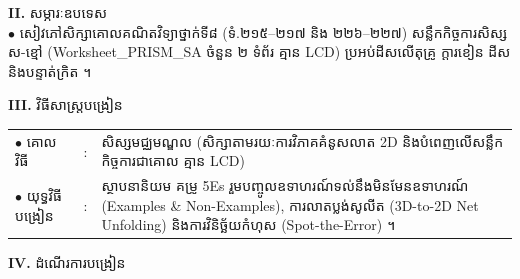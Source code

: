 \documentclass[a4paper,10pt]{article}
\newcommand{\en}[1]{{\TimesEn #1}}
\begin{document}
{\vspace{2pt}

\textbf{II.} {\muol សម្ភារៈឧបទេស}\\[1pt]
\hspace*{0.55cm}$\bullet$ \hspace{0.35cm} សៀវភៅសិក្សាគោលគណិតវិទ្យាថ្នាក់ទី៨ (ទំ.២១៥--២១៧ និង ២២៦--២២៧) សន្លឹកកិច្ចការសិស្ស ស-ខ្មៅ (\en{Worksheet\_PRISM\_SA} ចំនួន ២ ទំព័រ គ្មាន \en{LCD}) ប្រអប់ដីសលើតុគ្រូ ក្ដារខៀន ដីស និងបន្ទាត់ក្រិត ។

\vspace{2pt}

\textbf{III.} {\muol វិធីសាស្រ្តបង្រៀន}\\[1pt]
\hspace*{0.45cm}%
\begin{tabular}{@{}l l L{14.85cm}@{}}
  $\bullet$ \hspace{0.25cm} គោលវិធី & : & សិស្សមជ្ឈមណ្ឌល (សិក្សាតាមរយៈការវិភាគគំនូសលាត \en{2D} និងបំពេញលើសន្លឹកកិច្ចការជាគោល គ្មាន \en{LCD}) \\
  $\bullet$ \hspace{0.25cm} យុទ្ធវិធីបង្រៀន & : & ស្ថាបនានិយម គម្រូ \en{5Es} រួមបញ្ចូលឧទាហរណ៍ទល់នឹងមិនមែនឧទាហរណ៍ (\en{Examples \& Non-Examples}), ការលាតប្លង់សូលីត (\en{3D-to-2D Net Unfolding}) និងការវិនិច្ឆ័យកំហុស (\en{Spot-the-Error}) ។ \\
\end{tabular}
}

\vspace{2pt}

\textbf{IV.} {\muol ដំណើរការបង្រៀន}

\vspace{1pt}
\end{document}
